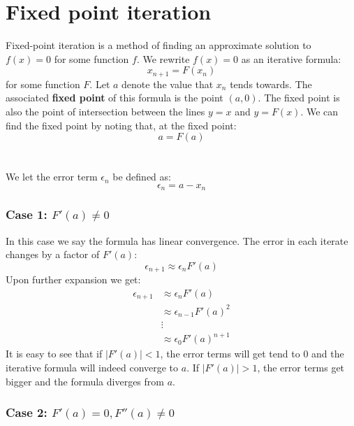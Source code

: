\documentclass{scrartcl}
\begin{document}
\section{Fixed point iteration}

Fixed-point iteration is a method of finding an approximate solution to $ f(x) = 0 $ for some function $ f $. We rewrite $ f(x) = 0 $ as an iterative formula:
\begin{equation}
x_{n+1} = F(x_{n})
\end{equation}
for some function $ F $. Let $ a $ denote the value that $ x_{n} $ tends towards. The associated \textbf{fixed point} of this formula is the point $ (a, 0) $. The fixed point is also the point of intersection between the lines $ y = x $ and $ y = F(x) $. We can find the fixed point by noting that, at the fixed point:
\begin{equation}
a = F(a)
\end{equation}
\\\\
We let the error term $ \epsilon_{n} $ be defined as:
\begin{equation}
\epsilon_{n} = a - x_{n}
\end{equation}

\subsubsection*{Case 1: $ F'(a) \neq 0 $}

In this case we say the formula has linear convergence. The error in each iterate changes by a factor of $ F'(a) $:
\begin{equation}
\epsilon_{n+1} \approx \epsilon_{n} F'(a)
\end{equation}
Upon further expansion we get:
\begin{align}
\epsilon_{n+1} & \approx \epsilon_{n} F'(a) \\
& \approx \epsilon_{n-1} F'(a)^{2} \\
& \vdots \\
& \approx \epsilon_{0} F'(a)^{n+1}
\end{align}
It is easy to see that if $ |F'(a)| < 1 $, the error terms will get tend to $ 0 $ and the iterative formula will indeed converge to $ a $. If $ |F'(a)| > 1 $, the error terms get bigger and the formula diverges from $ a $.

\subsubsection*{Case 2: $ F'(a) = 0, F''(a) \neq 0 $}
\end{document}
